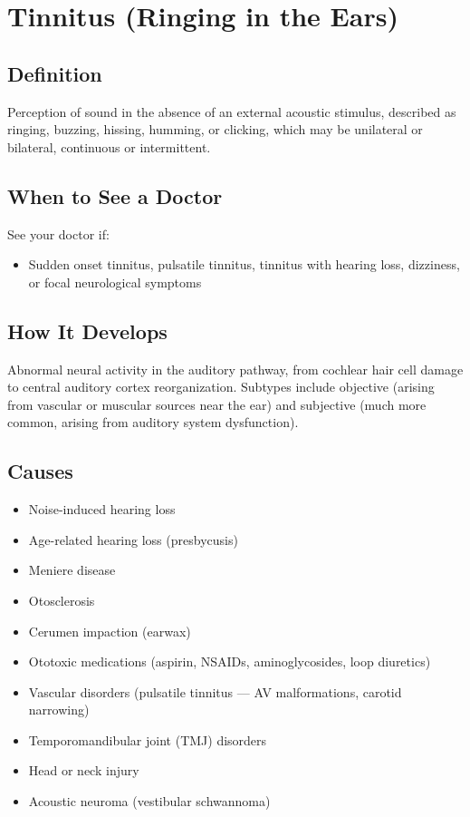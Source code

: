 \chapter{Tinnitus (Ringing in the Ears)}

\section*{Definition}
Perception of sound in the absence of an external acoustic stimulus, described as ringing, buzzing, hissing, humming, or clicking, which may be unilateral or bilateral, continuous or intermittent.

\section*{When to See a Doctor}
See your doctor if:
\begin{itemize}
  \item Sudden onset tinnitus, pulsatile tinnitus, tinnitus with hearing loss, dizziness, or focal neurological symptoms
\end{itemize}

\section*{How It Develops}
Abnormal neural activity in the auditory pathway, from cochlear hair cell damage to central auditory cortex reorganization. Subtypes include objective (arising from vascular or muscular sources near the ear) and subjective (much more common, arising from auditory system dysfunction).

\section*{Causes}
\begin{itemize}
  \item Noise-induced hearing loss
  \item Age-related hearing loss (presbycusis)
  \item Meniere disease
  \item Otosclerosis
  \item Cerumen impaction (earwax)
  \item Ototoxic medications (aspirin, NSAIDs, aminoglycosides, loop diuretics)
  \item Vascular disorders (pulsatile tinnitus — AV malformations, carotid narrowing)
  \item Temporomandibular joint (TMJ) disorders
  \item Head or neck injury
  \item Acoustic neuroma (vestibular schwannoma)
\end{itemize}

